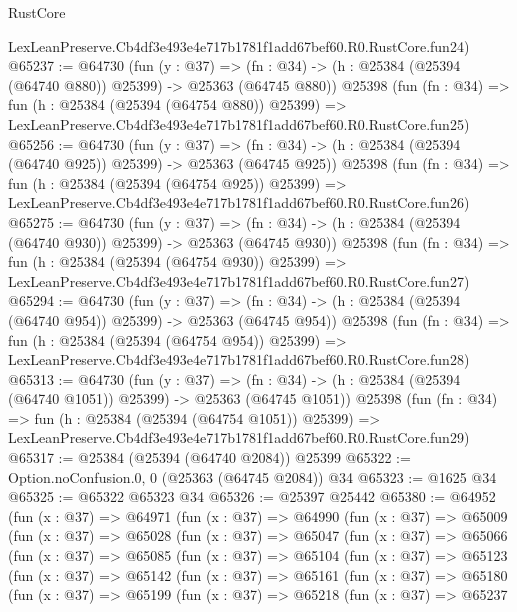 \begin{lexlean}{RustCore}
\begin{coremodule}
    LexLeanPreserve.Cb4df3e493e4e717b1781f1add67bef60.R0.RustCore.fun24)
@65237 := @64730
    (fun (y : @37) =>
    (fn : @34) -> (h : @25384 (@25394 (@64740 @880)) @25399) -> @25363 (@64745 @880))
    @25398
    (fun (fn : @34) =>
    fun (h : @25384 (@25394 (@64754 @880)) @25399) =>
    LexLeanPreserve.Cb4df3e493e4e717b1781f1add67bef60.R0.RustCore.fun25)
@65256 := @64730
    (fun (y : @37) =>
    (fn : @34) -> (h : @25384 (@25394 (@64740 @925)) @25399) -> @25363 (@64745 @925))
    @25398
    (fun (fn : @34) =>
    fun (h : @25384 (@25394 (@64754 @925)) @25399) =>
    LexLeanPreserve.Cb4df3e493e4e717b1781f1add67bef60.R0.RustCore.fun26)
@65275 := @64730
    (fun (y : @37) =>
    (fn : @34) -> (h : @25384 (@25394 (@64740 @930)) @25399) -> @25363 (@64745 @930))
    @25398
    (fun (fn : @34) =>
    fun (h : @25384 (@25394 (@64754 @930)) @25399) =>
    LexLeanPreserve.Cb4df3e493e4e717b1781f1add67bef60.R0.RustCore.fun27)
@65294 := @64730
    (fun (y : @37) =>
    (fn : @34) -> (h : @25384 (@25394 (@64740 @954)) @25399) -> @25363 (@64745 @954))
    @25398
    (fun (fn : @34) =>
    fun (h : @25384 (@25394 (@64754 @954)) @25399) =>
    LexLeanPreserve.Cb4df3e493e4e717b1781f1add67bef60.R0.RustCore.fun28)
@65313 := @64730
    (fun (y : @37) =>
    (fn : @34) -> (h : @25384 (@25394 (@64740 @1051)) @25399) -> @25363 (@64745 @1051))
    @25398
    (fun (fn : @34) =>
    fun (h : @25384 (@25394 (@64754 @1051)) @25399) =>
    LexLeanPreserve.Cb4df3e493e4e717b1781f1add67bef60.R0.RustCore.fun29)
@65317 := @25384 (@25394 (@64740 @2084)) @25399
@65322 := Option.noConfusion.{0, 0} (@25363 (@64745 @2084)) @34
@65323 := @1625 @34
@65325 := @65322 @65323 @34
@65326 := @25397 @25442
@65380 := @64952
    (fun (x : @37) =>
    @64971
      (fun (x : @37) =>
      @64990
        (fun (x : @37) =>
        @65009
          (fun (x : @37) =>
          @65028
            (fun (x : @37) =>
            @65047
              (fun (x : @37) =>
              @65066
                (fun (x : @37) =>
                @65085
                  (fun (x : @37) =>
                  @65104
                    (fun (x : @37) =>
                    @65123
                      (fun (x : @37) =>
                      @65142
                        (fun (x : @37) =>
                        @65161
                          (fun (x : @37) =>
                          @65180
                            (fun (x : @37) =>
                            @65199
                              (fun (x : @37) =>
                              @65218
                                (fun (x : @37) =>
                                @65237

\end{coremodule}
\end{lexlean}
